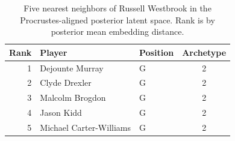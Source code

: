 \begin{table}[htbp]
  \centering\small
  \begin{tabular}{rllc}
    \toprule
    Rank & Player & Position & Archetype \\
    \midrule
    1 & Dejounte Murray & G & 2 \\
    2 & Clyde Drexler & G & 2 \\
    3 & Malcolm Brogdon & G & 2 \\
    4 & Jason Kidd & G & 2 \\
    5 & Michael Carter-Williams & G & 2 \\
    \bottomrule
  \end{tabular}
  \caption{Five nearest neighbors of Russell Westbrook in the Procrustes-aligned posterior latent space. Rank is by posterior mean embedding distance.}
  \label{tab:Russell_Westbrook_neighbors}
\end{table}

